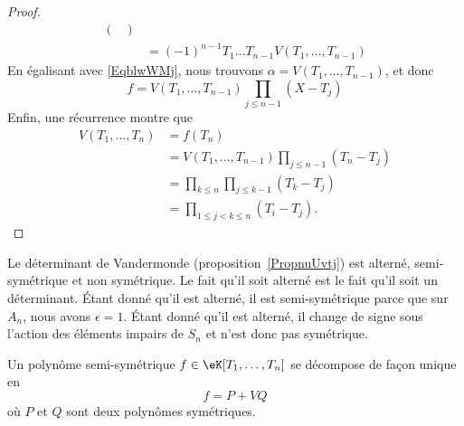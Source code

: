 \begin{proof}
\begin{subequations}
\begin{align}
\begin{pmatrix}
			                                       \end{pmatrix} \\
			     & =(-1)^{n-1}T_1\ldots T_{n-1}V(T_1,\ldots, T_{n-1})
		\end{align}
	\end{subequations}
	En égalisant avec \eqref{EqblwWMj}, nous trouvons \( \alpha=V(T_1,\ldots, T_{n-1})\), et donc
	\begin{equation}
		f=V(T_1,\ldots, T_{n-1})\prod_{j\leq n-1}(X-T_j)
	\end{equation}
	Enfin, une récurrence montre que
	\begin{subequations}
		\begin{align}
			V(T_1,\ldots, T_n) & =f(T_n)                                           \\
			                   & =V(T_1,\ldots, T_{n-1})\prod_{j\leq n-1}(T_n-T_j) \\
			                   & =\prod_{k\leq n}\prod_{j\leq k-1}(T_k-T_j)        \\
			                   & =\prod_{1\leq j<k\leq n}(T_i-T_j).
		\end{align}
	\end{subequations}
\end{proof}

\begin{example}
	Le déterminant de Vandermonde (proposition~\ref{PropnuUvtj}) est alterné, semi-symétrique et non symétrique. Le fait qu'il soit alterné est le fait qu'il soit un déterminant. Étant donné qu'il est alterné, il est semi-symétrique parce que sur \( A_n\), nous avons \( \epsilon=1\). Étant donné qu'il est alterné, il change de signe sous l'action des éléments impairs de \( S_n\) et n'est donc pas symétrique.
\end{example}

\begin{proposition} \label{PropUDqXax}
	Un polynôme semi-symétrique \( f\in \eK[T_1,\ldots, T_n]\) se décompose de façon unique en
	\begin{equation}
		f=P+VQ
	\end{equation}
	où \( P\) et \( Q\) sont deux polynômes symétriques.
\end{proposition}

